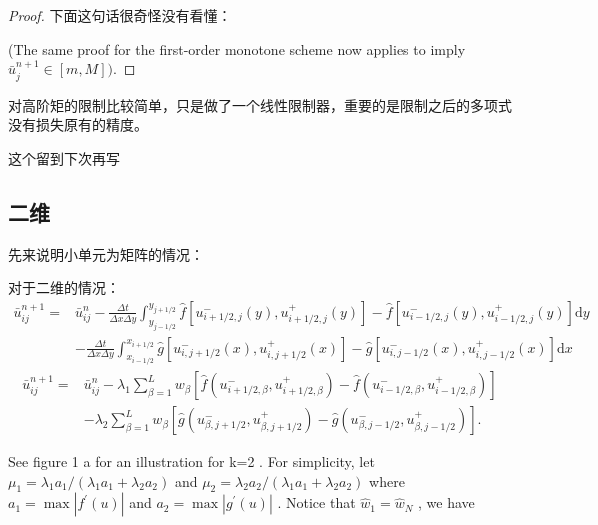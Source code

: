 \documentclass{book}
\begin{document}
\begin{example}
\begin{example}{}{}
\begin{example}
\begin{example}
\begin{example}
\begin{proof}
    下面这句话很奇怪没有看懂：

    (The same proof for the first-order monotone scheme now applies to imply  $\bar{u}_{j}^{n+1} \in[m, M])$.
\end{proof}

对高阶矩的限制比较简单，只是做了一个线性限制器，重要的是限制之后的多项式没有损失原有的精度。

\begin{remark}
    这个留到下次再写
\end{remark}
\subsection{二维}
先来说明小单元为矩阵的情况：

对于二维的情况：
\begin{equation}
    \begin{aligned}
        \bar{u}_{i j}^{n+1}= & \bar{u}_{i j}^{n}-\frac{\Delta t}{\Delta x \Delta y} \int_{y_{j-1 / 2}}^{y_{j+1 / 2}} \hat{f}\left[u_{i+1 / 2, j}^{-}(y), u_{i+1 / 2, j}^{+}(y)\right]-\hat{f}\left[u_{i-1 / 2, j}^{-}(y), u_{i-1 / 2, j}^{+}(y)\right] \mathrm{d} y \\
                             & -\frac{\Delta t}{\Delta x \Delta y} \int_{x_{i-1 / 2}}^{x_{i+1 / 2}} \hat{g}\left[u_{i, j+1 / 2}^{-}(x), u_{i, j+1 / 2}^{+}(x)\right]-\hat{g}\left[u_{i, j-1 / 2}^{-}(x), u_{i, j-1 / 2}^{+}(x)\right] \mathrm{d} x
    \end{aligned}
\end{equation}
\begin{equation}
    \begin{aligned}
        \bar{u}_{i j}^{n+1}= & \bar{u}_{i j}^{n}-\lambda_{1} \sum_{\beta=1}^{L} w_{\beta}\left[\hat{f}\left(u_{i+1 / 2, \beta}^{-}, u_{i+1 / 2, \beta}^{+}\right)-\hat{f}\left(u_{i-1 / 2, \beta}^{-}, u_{i-1 / 2, \beta}^{+}\right)\right] \\
                             & -\lambda_{2} \sum_{\beta=1}^{L} w_{\beta}\left[\hat{g}\left(u_{\beta, j+1 / 2}^{-}, u_{\beta, j+1 / 2}^{+}\right)-\hat{g}\left(u_{\beta, j-1 / 2}^{-}, u_{\beta, j-1 / 2}^{+}\right)\right] .
    \end{aligned}
\end{equation}


See figure  1 a  for an illustration for  k=2 . For simplicity, let  $\mu_{1}=\lambda_{1} a_{1} /\left(\lambda_{1} a_{1}+\right.   \left.\lambda_{2} a_{2}\right)$  and  $\mu_{2}=\lambda_{2} a_{2} /\left(\lambda_{1} a_{1}+\lambda_{2} a_{2}\right) $ where  $a_{1}=\max \left|f^{\prime}(u)\right|$  and  $a_{2}=\max \left|g^{\prime}(u)\right|$ . Notice that  $\hat{w}_{1}=\hat{w}_{N}$ , we have


\end{example}
\end{example}
\end{example}
\end{example}
\end{example}
\end{document}
